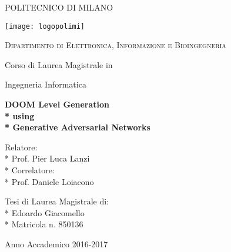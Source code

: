 \begin{titlepage}
	\centering
	
	{\scshape\LARGE POLITECNICO DI MILANO \par}\vspace{0.5cm}
		\texttt{[image: logopolimi]}\par
		\vspace{0.5cm}
	{\scshape\Large Dipartimento di Elettronica, Informazione e Bioingegneria \par}\vspace{1cm}
	\vspace{0.5cm}
	{\Large Corso di Laurea Magistrale in \par}
	{\Large Ingegneria Informatica \par}
	\vspace{1.5cm}
	{\huge\bfseries DOOM Level Generation \\* 
		using \\* Generative Adversarial Networks\par}
	\vspace{2cm}
	 
	\vfill
	\begin{flushleft}
		{\Large 
			Relatore: \\*
			Prof. Pier Luca Lanzi \\*
			Correlatore: \\*
			Prof. Daniele Loiacono
			\par}
	\end{flushleft}
	\begin{flushright}
		{\Large 
			Tesi di Laurea Magistrale di: \\*
			Edoardo Giacomello \\*
			Matricola n. 850136
		}
	\end{flushright}
	 
	\vfill

	{\large Anno Accademico 2016-2017\par}
\end{titlepage}
